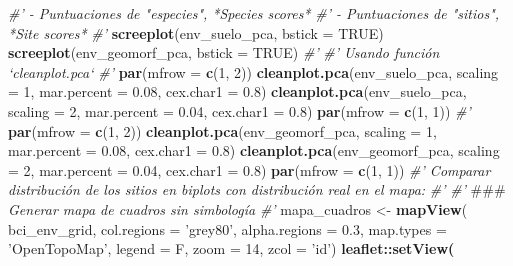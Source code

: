 \documentclass[11pt,]{article}
\newenvironment{Shaded}{\begin{snugshade}}{\end{snugshade}}
\newcommand{\KeywordTok}[1]{\textcolor[rgb]{0.13,0.29,0.53}{\textbf{#1}}}
\newcommand{\DataTypeTok}[1]{\textcolor[rgb]{0.13,0.29,0.53}{#1}}
\newcommand{\DecValTok}[1]{\textcolor[rgb]{0.00,0.00,0.81}{#1}}
\newcommand{\FloatTok}[1]{\textcolor[rgb]{0.00,0.00,0.81}{#1}}
\newcommand{\StringTok}[1]{\textcolor[rgb]{0.31,0.60,0.02}{#1}}
\newcommand{\CommentTok}[1]{\textcolor[rgb]{0.56,0.35,0.01}{\textit{#1}}}
\newcommand{\OtherTok}[1]{\textcolor[rgb]{0.56,0.35,0.01}{#1}}
\newcommand{\OperatorTok}[1]{\textcolor[rgb]{0.81,0.36,0.00}{\textbf{#1}}}
\newcommand{\AlertTok}[1]{\textcolor[rgb]{0.94,0.16,0.16}{#1}}
\newcommand{\NormalTok}[1]{#1}
\begin{document}
\begin{Shaded}
\begin{Highlighting}[]
{{{{{{{\CommentTok{#' - Puntuaciones de "especies", *Species scores*}
\CommentTok{#' - Puntuaciones de "sitios", *Site scores*}
\CommentTok{#' }
\KeywordTok{screeplot}\NormalTok{(env_suelo_pca, }\DataTypeTok{bstick =} \OtherTok{TRUE}\NormalTok{)}
\KeywordTok{screeplot}\NormalTok{(env_geomorf_pca, }\DataTypeTok{bstick =} \OtherTok{TRUE}\NormalTok{)}
\CommentTok{#' }
\CommentTok{#' Usando función `cleanplot.pca`}
\CommentTok{#' }
\KeywordTok{par}\NormalTok{(}\DataTypeTok{mfrow =} \KeywordTok{c}\NormalTok{(}\DecValTok{1}\NormalTok{, }\DecValTok{2}\NormalTok{))}
\KeywordTok{cleanplot.pca}\NormalTok{(env_suelo_pca, }\DataTypeTok{scaling =} \DecValTok{1}\NormalTok{, }\DataTypeTok{mar.percent =} \FloatTok{0.08}\NormalTok{, }\DataTypeTok{cex.char1 =} \FloatTok{0.8}\NormalTok{)}
\KeywordTok{cleanplot.pca}\NormalTok{(env_suelo_pca, }\DataTypeTok{scaling =} \DecValTok{2}\NormalTok{, }\DataTypeTok{mar.percent =} \FloatTok{0.04}\NormalTok{, }\DataTypeTok{cex.char1 =} \FloatTok{0.8}\NormalTok{)}
\KeywordTok{par}\NormalTok{(}\DataTypeTok{mfrow =} \KeywordTok{c}\NormalTok{(}\DecValTok{1}\NormalTok{, }\DecValTok{1}\NormalTok{))}
\CommentTok{#' }
\KeywordTok{par}\NormalTok{(}\DataTypeTok{mfrow =} \KeywordTok{c}\NormalTok{(}\DecValTok{1}\NormalTok{, }\DecValTok{2}\NormalTok{))}
\KeywordTok{cleanplot.pca}\NormalTok{(env_geomorf_pca, }\DataTypeTok{scaling =} \DecValTok{1}\NormalTok{, }\DataTypeTok{mar.percent =} \FloatTok{0.08}\NormalTok{, }\DataTypeTok{cex.char1 =} \FloatTok{0.8}\NormalTok{)}
\KeywordTok{cleanplot.pca}\NormalTok{(env_geomorf_pca, }\DataTypeTok{scaling =} \DecValTok{2}\NormalTok{, }\DataTypeTok{mar.percent =} \FloatTok{0.04}\NormalTok{, }\DataTypeTok{cex.char1 =} \FloatTok{0.8}\NormalTok{)}
\KeywordTok{par}\NormalTok{(}\DataTypeTok{mfrow =} \KeywordTok{c}\NormalTok{(}\DecValTok{1}\NormalTok{, }\DecValTok{1}\NormalTok{))}
\CommentTok{#' Comparar distribución de los sitios en biplots con distribución real en el mapa:}
\CommentTok{#' }
\CommentTok{#' }\AlertTok{###}\CommentTok{ Generar mapa de cuadros sin simbología}
\CommentTok{#' }
\NormalTok{mapa_cuadros <-}\StringTok{ }\KeywordTok{mapView}\NormalTok{(}
\NormalTok{  bci_env_grid,}
  \DataTypeTok{col.regions =} \StringTok{'grey80'}\NormalTok{,}
  \DataTypeTok{alpha.regions =} \FloatTok{0.3}\NormalTok{,}
  \DataTypeTok{map.types =} \StringTok{'OpenTopoMap'}\NormalTok{,}
  \DataTypeTok{legend =}\NormalTok{ F, }\DataTypeTok{zoom =} \DecValTok{14}\NormalTok{,}
  \DataTypeTok{zcol =} \StringTok{'id'}\NormalTok{) }\OperatorTok{%
\StringTok{  }\NormalTok{leaflet}\OperatorTok{::}\KeywordTok{setView}\NormalTok{(}
}}}}}}}}
\end{Highlighting}
\end{Shaded}
\end{document}
